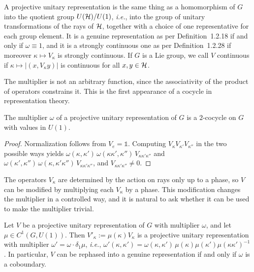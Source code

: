 \begin{remark}
	A projective unitary representation is the same thing as a homomorphism of $G$ into the quotient group $U(\H)/U(1)$, \textit{i.e.}, into the group of unitary transformations of the rays of $\H$, together with a choice of one representative for each group element. It is a genuine representation as per Definition~1.2.18 if and only if $\omega\equiv1$, and it is a strongly continuous one as per Definition~1.2.28 if moreover $\kappa\mapsto V_\kappa$ is strongly continuous. If $G$ is a Lie group, we call $V$ continuous if $\kappa\mapsto|(x,V_\kappa y)|$ is continuous for all $x,y\in\H$.
\end{remark}

The multiplier is not an arbitrary function, since the associativity of the product of operators constrains it. This is the first appearance of a cocycle in representation theory.

\begin{proposition}\label{prop:multiplier-cocycle}
	The multiplier $\omega$ of a projective unitary representation of $G$ is a $2$-cocycle on $G$ with values in $U(1)$.
\end{proposition}

\begin{proof}
	Normalization follows from $V_e=\mathbb{1}$. Computing $V_\kappa V_{\kappa'}V_{\kappa''}$ in the two possible ways yields $\omega(\kappa,\kappa')\,\omega(\kappa\kappa',\kappa'')\,V_{\kappa\kappa'\kappa''}$ and $\omega(\kappa',\kappa'')\,\omega(\kappa,\kappa'\kappa'')\,V_{\kappa\kappa'\kappa''}$, and $V_{\kappa\kappa'\kappa''}\neq0$.
\end{proof}

The operators $V_\kappa$ are determined by the action on rays only up to a phase, so $V$ can be modified by multiplying each $V_\kappa$ by a phase. This modification changes the multiplier in a controlled way, and it is natural to ask whether it can be used to make the multiplier trivial.

\begin{proposition}[Rephasing]\label{prop:rephasing}
	Let $V$ be a projective unitary representation of $G$ with multiplier $\omega$, and let $\mu\in C^1(G,U(1))$. Then $V'_\kappa:=\mu(\kappa)V_\kappa$ is a projective unitary representation with multiplier $\omega'=\omega\cdot\delta_1\mu$, \textit{i.e.}, $\omega'(\kappa,\kappa')=\omega(\kappa,\kappa')\,\mu(\kappa)\mu(\kappa')\mu(\kappa\kappa')^{-1}$. In particular, $V$ can be rephased into a genuine representation if and only if $\omega$ is a coboundary.
\end{proposition}

